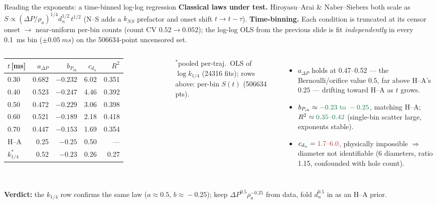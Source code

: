 \documentclass[aspectratio=169,11pt]{beamer}
\newcommand{\good}[1]{\textcolor{goodGreen}{#1}}
\newcommand{\warn}[1]{\textcolor{warnRed}{#1}}
\newcommand{\blue}[1]{\textcolor{aaltoBlue}{#1}}
\begin{document}
\begin{frame}{Reading the exponents: a time-binned log-log regression}
\small
\textbf{Classical laws under test.}\; Hiroyasu--Arai \& Naber--Siebers both scale as $S\propto(\Delta P/\rho_a)^{1/4} d_n^{1/2}\,t^{1/2}$ (N--S adds a $k_{NS}$ prefactor and onset shift $t\!\to\!t-\tau$). \textbf{Time-binning.} Each condition is truncated at its censor onset $\to$ near-uniform per-bin counts (count CV \good{$0.52\to0.052$}); the log-log OLS from the previous slide is fit \emph{independently} in every \SI{0.1}{ms} bin ($\pm\SI{0.05}{ms}$) on the \num{506634}-point uncensored set.

\smallskip
\begin{columns}[T,onlytextwidth]
\centering
\footnotesize
\renewcommand{\arraystretch}{1.0}
\setlength{\tabcolsep}{4pt}
\begin{tabular}{lrrrr}
\toprule
$t$\,[ms] & $a_{\Delta P}$ & $b_{P_{\mathrm{ch}}}$ & $c_{d_n}$ & $R^2$ \\
\midrule
0.30 & 0.682 & $-0.232$ & \warn{6.02} & 0.351 \\
0.40 & \good{0.523} & $-0.247$ & \warn{4.46} & 0.392 \\
0.50 & \good{0.472} & $-0.229$ & \warn{3.06} & 0.398 \\
0.60 & \good{0.521} & $-0.189$ & \warn{2.18} & 0.418 \\
0.70 & 0.447 & $-0.153$ & \warn{1.69} & 0.354 \\
\midrule
H--A & 0.25 & $-0.25$ & 0.50 & --- \\
$k_{1/4}^{\ast}$ & \good{0.52} & $-0.23$ & \warn{0.26} & 0.27 \\
\bottomrule
\end{tabular}

{\scriptsize $^\ast$pooled per-traj.\ OLS of $\log k_{1/4}$ (\num{24316} fits); rows above: per-bin $S(t)$ (\num{506634} pts).}
\footnotesize
\begin{itemize}\setlength\itemsep{1.5pt}
  \item $a_{\Delta P}$ holds at \good{0.47--0.52} --- the \blue{Bernoulli/orifice} value $0.5$, far above H--A's $0.25$ --- drifting toward H--A as $t$ grows.
  \item $b_{P_{\mathrm{ch}}}\approx\good{-0.23\text{ to }-0.25}$, matching H--A; $R^2\approx\good{0.35\text{--}0.42}$ (single-bin scatter large, exponents stable).
  \item $c_{d_n}=\warn{1.7\text{--}6.0}$, physically impossible $\Rightarrow$ diameter \warn{not identifiable} (6 diameters, ratio 1.15, confounded with hole count).
\end{itemize}
\end{columns}

\vspace{2pt}
{\footnotesize\textbf{Verdict:} the $k_{1/4}$ row confirms the same law ($a\!\approx\!0.5$, $b\!\approx\!-0.25$); keep $\Delta P^{0.5}\rho_a^{-0.25}$ from data, fold $d_n^{0.5}$ in as an H--A prior.}
\end{frame}
\end{document}
